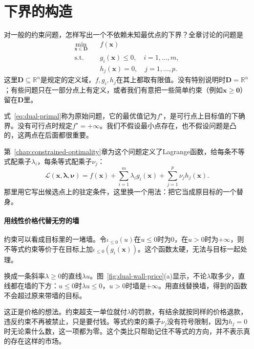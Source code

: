 \section{下界的构造}
\label{sec:dual-lower-bound}

对一般的约束问题，怎样写出一个不依赖未知最优点的下界？全章讨论的问题是
\begin{equation}
 \begin{aligned}
 \min_{\bm{x}\in\bm{D}}\quad & f(\bm{x})\\
 \text{s.t.}\quad & g_i(\bm{x})\leq0,\quad i=1,\ldots,m,\\
 & h_j(\bm{x})=0,\quad j=1,\ldots,p.
 \end{aligned}
 \label{eq:dual-primal}
\end{equation}
这里$\bm{D}\subseteq\mathbb{R}^n$是规定的定义域，$f,g_i,h_j$在其上都取有限值。没有特别说明时$\bm{D}=\mathbb{R}^n$；有些问题只在一部分点上有定义，或者我们有意把一些简单约束（例如$\bm{x}\geq\bm{0}$）留在$\bm{D}$里。

式~\eqref{eq:dual-primal}称为原始问题，它的最优值记为$f^\star$，是可行点上目标值的下确界。没有可行点时规定$f^\star=+\infty$。我们不假设最小点存在，也不假设问题是凸的，这两点在后面都很重要。

第~\ref{chap:constrained-optimality}章为这个问题定义了Lagrange函数，给每条不等式配乘子$\lambda_i$，每条等式配乘子$\nu_j$：
\begin{equation}
 \mathcal{L}(\bm{x},\bm{\lambda},\bm{\nu})=f(\bm{x})+\sum_{i=1}^m\lambda_ig_i(\bm{x})+\sum_{j=1}^p\nu_jh_j(\bm{x}).
 \label{eq:dual-lagrangian}
\end{equation}
那里用它写出候选点上的驻定条件，这里换一个用法：把它当成原目标的一个替身。

\paragraph{用线性价格代替无穷的墙}
约束可以看成目标里的一堵墙。令$\iota_{\leq0}(u)$在$u\leq0$时为$0$，在$u>0$时为$+\infty$，则不等式约束等价于在目标上加$\iota_{\leq0}(g_i(\bm{x}))$。这个函数太硬，无法与目标一起处理。

换成一条斜率$\lambda\geq0$的直线$\lambda u$。图~\ref{fig:dual-wall-price}(a)显示，不论$\lambda$取多少，直线都在墙的下方：$u\leq0$时$\lambda u\leq0$，$u>0$时墙是$+\infty$。用直线替换墙，得到的函数不会超过原来带墙的目标。

这正是价格的想法。约束超支一单位就付$\lambda$的罚款，有结余就按同样的价格退款，违反约束不再被禁止，只是要付钱。等式约束的乘子$\nu_j$没有符号限制，因为$h_j=0$时无论乘什么数，这一项都为零。这个类比只帮助记住不等式的方向，并不表示真的存在这样的市场。

